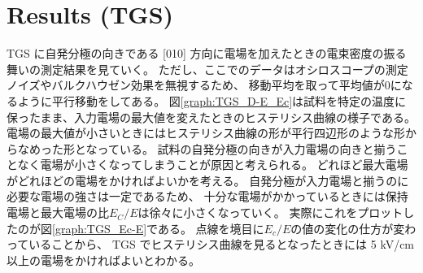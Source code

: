 \documentclass[9pt,dvipdfmx,a4paper]{jsarticle}
\begin{document}
\section{Results (TGS)}
TGS に自発分極の向きである [010] 方向に電場を加えたときの電束密度の振る舞いの測定結果を見ていく。
ただし、ここでのデータはオシロスコープの測定ノイズやバルクハウゼン効果を無視するため、
移動平均を取って平均値が0になるように平行移動をしてある。
図\ref{graph:TGS_D-E_Ec}は試料を特定の温度に保ったまま、入力電場の最大値を変えたときのヒステリシス曲線の様子である。
電場の最大値が小さいときにはヒステリシス曲線の形が平行四辺形のような形からなめった形となっている。
試料の自発分極の向きが入力電場の向きと揃うことなく電場が小さくなってしまうことが原因と考えられる。
どれほど最大電場がどれほどの電場をかければよいかを考える。
自発分極が入力電場と揃うのに必要な電場の強さは一定であるため、
十分な電場がかかっているときには保持電場と最大電場の比\(E_C/E\)は徐々に小さくなっていく。
実際にこれをプロットしたのが図\ref{graph:TGS_Ec-E}である。
点線を境目に\(E_c/E\)の値の変化の仕方が変わっていることから、
TGS でヒステリシス曲線を見るとなったときには 5 kV/cm 以上の電場をかければよいとわかる。
\end{document}

